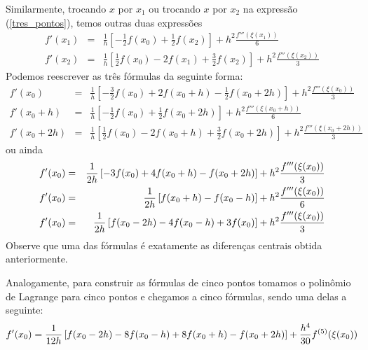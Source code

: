 Similarmente, trocando $x$ por $x_1$ ou trocando $x$ por $x_2$ na expressão (\ref{tres_pontos}), temos outras duas expressões
\begin{eqnarray*}
f'(x_1)&=&\frac{1}{h}\left[-\frac{1}{2}f(x_0)
+\frac{1}{2}f(x_{2})\right]+h^2\frac{f'''(\xi(x_1))}{6}\\
f'(x_2)&=&\frac{1}{h}\left[\frac{1}{2}f(x_0)-2f(x_{1})
+\frac{3}{2}f(x_{2})\right]+h^2\frac{f'''(\xi(x_2))}{3}
\end{eqnarray*}
Podemos reescrever as três fórmulas da seguinte forma:
\begin{eqnarray*}
f'(x_0)&=&\frac{1}{h}\left[-\frac{3}{2}f(x_0)+2f(x_{0}+h)
-\frac{1}{2}f(x_{0}+2h)\right]+h^2\frac{f'''(\xi(x_0))}{3}\\
f'(x_0+h)&=&\frac{1}{h}\left[-\frac{1}{2}f(x_0)
+\frac{1}{2}f(x_{0}+2h)\right]+h^2\frac{f'''(\xi(x_0+h))}{6}\\
f'(x_0+2h)&=&\frac{1}{h}\left[\frac{1}{2}f(x_0)-2f(x_{0}+h)
+\frac{3}{2}f(x_{0}+2h)\right]+h^2\frac{f'''(\xi(x_{0}+2h))}{3}
\end{eqnarray*}
ou ainda
\begin{eqnarray}
{\label{tres_pontos_frente}}f'(x_0)&=&\frac{1}{2h}\left[-3f(x_0)+4f(x_{0}+h)
-f(x_{0}+2h)\right]+h^2\frac{f'''(\xi(x_0))}{3}\\
{\label{tres_pontos_central}}f'(x_0)&=&\frac{1}{2h}\left[f(x_{0}+h)-f(x_0-h)\right]+h^2\frac{f'''(\xi(x_0))}{6}\\
{\label{tres_pontos_traz}}f'(x_0)&=&\frac{1}{2h}\left[f(x_0-2h)-4f(x_{0}-h)
+3f(x_{0})\right]+h^2\frac{f'''(\xi(x_{0}))}{3}
\end{eqnarray}
Observe que uma das fórmulas é exatamente as diferenças centrais obtida anteriormente.

Analogamente, para construir as fórmulas de cinco pontos tomamos o polinômio de Lagrange para cinco pontos e chegamos a cinco fórmulas, sendo uma delas a seguinte:
\begin{equation}
{\label{cinco_pontos}}f'(x_0)=\frac{1}{12h}\left[f(x_0-2h)-8f(x_0-h)+8f(x_0+h)-f(x_0+2h)\right]+\frac{h^4}{30}f^{(5)}(\xi(x_0))
\end{equation}

